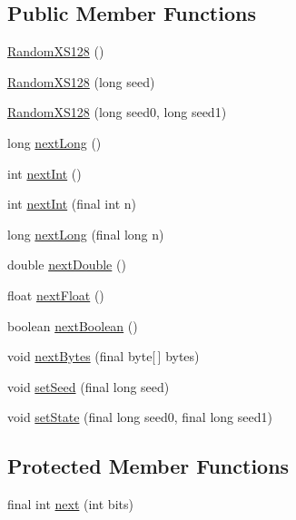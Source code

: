 \subsection*{Public Member Functions}
\begin{DoxyCompactItemize}
\item 
\hyperlink{classairhockeyjava_1_1util_1_1_random_x_s128_a95de8b8e097e1fdd5075538e669e6b27}{Random\+X\+S128} ()
\item 
\hyperlink{classairhockeyjava_1_1util_1_1_random_x_s128_a641ef5b6aa335ca58ebc925a67047099}{Random\+X\+S128} (long seed)
\item 
\hyperlink{classairhockeyjava_1_1util_1_1_random_x_s128_a7fbec667a94fe5aeb1a6de1bbf0595ad}{Random\+X\+S128} (long seed0, long seed1)
\item 
long \hyperlink{classairhockeyjava_1_1util_1_1_random_x_s128_a6ca8650077e3c733899f7d2d55a49565}{next\+Long} ()
\item 
int \hyperlink{classairhockeyjava_1_1util_1_1_random_x_s128_a091ee455afe22a3432cde0bea7106f9d}{next\+Int} ()
\item 
int \hyperlink{classairhockeyjava_1_1util_1_1_random_x_s128_ae53fc56bba54f92a0e10d85205d583c1}{next\+Int} (final int n)
\item 
long \hyperlink{classairhockeyjava_1_1util_1_1_random_x_s128_aba582870dea232e78e58ea8ea13c57e9}{next\+Long} (final long n)
\item 
double \hyperlink{classairhockeyjava_1_1util_1_1_random_x_s128_a60ed43d103694bd00dc93a8a29e929b4}{next\+Double} ()
\item 
float \hyperlink{classairhockeyjava_1_1util_1_1_random_x_s128_ae668fc5a1778fc7bc7b777daf15d60f2}{next\+Float} ()
\item 
boolean \hyperlink{classairhockeyjava_1_1util_1_1_random_x_s128_aeb23977cfda2f2327aca20444b8db9c1}{next\+Boolean} ()
\item 
void \hyperlink{classairhockeyjava_1_1util_1_1_random_x_s128_a093d9ed33e9d833ac43b6b44c40aff3e}{next\+Bytes} (final byte\mbox{[}$\,$\mbox{]} bytes)
\item 
void \hyperlink{classairhockeyjava_1_1util_1_1_random_x_s128_a2e10d96d099fe73f649894c9d7cff897}{set\+Seed} (final long seed)
\item 
void \hyperlink{classairhockeyjava_1_1util_1_1_random_x_s128_af6e4a966018a565fcf1f2db7843acd55}{set\+State} (final long seed0, final long seed1)
\end{DoxyCompactItemize}
\subsection*{Protected Member Functions}
\begin{DoxyCompactItemize}
\item 
final int \hyperlink{classairhockeyjava_1_1util_1_1_random_x_s128_a40c264ece3d34664ea1642f3652a966f}{next} (int bits)
\end{DoxyCompactItemize}


